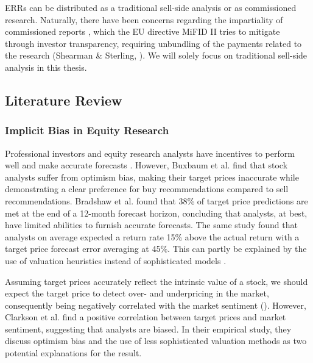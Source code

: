ERRs can be distributed as a traditional sell-side analysis or as commissioned research. Naturally, there have been concerns regarding the impartiality of commissioned reports \parencite{gunvaldsen2021difference}, which the EU directive MiFID II tries to mitigate through investor transparency, requiring unbundling of the payments related to the research (Shearman \& Sterling, \cite*{shearmanMiFIDUpdate}). We will solely focus on traditional sell-side analysis in this thesis. 


\subsection{Literature Review}
\label{sec:LitReview}

\subsubsection{Implicit Bias in Equity Research} %
\label{sec:implicitbiaserr}


Professional investors and equity research analysts have incentives to perform well and make accurate forecasts \parencite{chevalier1997risk}. However, Buxbaum et al. \parencite*{buxbaum2019target} find that stock analysts suffer from optimism bias, making their target prices inaccurate while demonstrating a clear preference for buy recommendations compared to sell recommendations. Bradshaw et al. \parencite*{bradshaw2013sell} found that 38\% of target price predictions are met at the end of a 12-month forecast horizon, concluding that analysts, at best, have limited abilities to furnish accurate forecasts. The same study found that analysts on average expected a return rate 15\% above the actual return with a target price forecast error averaging at 45\%. This can partly be explained by the use of valuation heuristics instead of sophisticated models \parencite{gleason2013valuation}. 

Assuming target prices accurately reflect the intrinsic value of a stock, we should expect the target price to detect over- and underpricing in the market, consequently being negatively correlated with the market sentiment (\cite{buxbaum2019target}). However, Clarkson et al. \parencite*{clarkson2015target} find a positive correlation between target prices and market sentiment, suggesting that analysts are biased. In their empirical study, they discuss optimism bias and the use of less sophisticated valuation methods as two potential explanations for the result.

